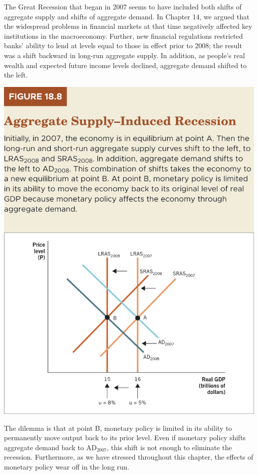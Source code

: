 \documentclass[11pt]{article} %
\begin{document}
The Great Recession that began in 2007 seems to have included both shifts of aggregate supply and shifts of aggregate demand. In Chapter 14, we argued that the widespread problems in financial markets at that time negatively affected key institutions in the macroeconomy. Further, new financial regulations restricted banks' ability to lend at levels equal to those in effect prior to 2008; the result was a shift backward in long-run aggregate supply. In addition, as people's real wealth and expected future income levels declined, aggregate demand shifted to the left.

\begin{center}
\includegraphics[scale=0.5]{images/Figure 18.8.png} 
\end{center}

The dilemma is that at point B, monetary policy is limited in its ability to permanently move output back to its prior level. Even if monetary policy shifts aggregate demand back to $\text{AD}_{2007}$, this shift is not enough to eliminate the recession. Furthermore, as we have stressed throughout this chapter, the effects of monetary policy wear off in the long run.
\end{document}
